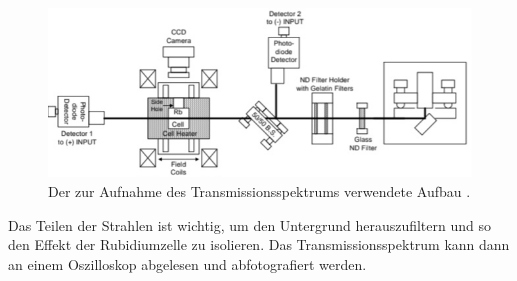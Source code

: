 \begin{figure}[H]
    \centering
    \includegraphics[width=\textwidth]{data/aufbau3.jpg}
    \caption{Der zur Aufnahme des Transmissionsspektrums verwendete Aufbau \cite{Anleitung60}.}
    \label{fig:auf3}
\end{figure}
\noindent
Das Teilen der Strahlen ist wichtig, um den Untergrund herauszufiltern und so den Effekt der Rubidiumzelle zu isolieren. Das Transmissionsspektrum kann dann an einem Oszilloskop
abgelesen und abfotografiert werden.


